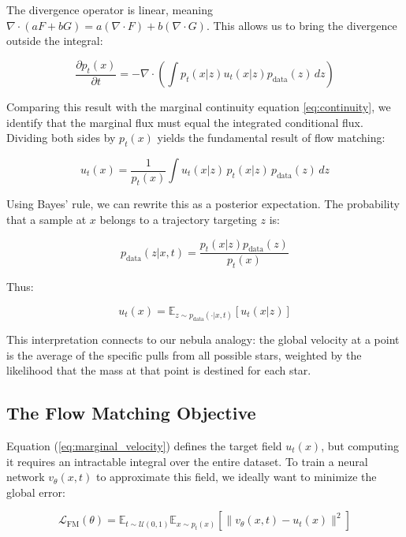 \documentclass{book}
\begin{document}
The divergence operator is linear, meaning $\nabla \cdot (aF + bG) = a(\nabla \cdot F) + b(\nabla \cdot G)$. This allows us to bring the divergence outside the integral:

\begin{equation}
\frac{\partial p_t(x)}{\partial t} = -\nabla \cdot \left( \int p_t(x|z) u_t(x|z) p_{\text{data}}(z) \, dz \right)
\end{equation}

Comparing this result with the marginal continuity equation \ref{eq:continuity}, we identify that the marginal flux must equal the integrated conditional flux. Dividing both sides by $p_t(x)$ yields the fundamental result of flow matching:

\begin{equation} \label{eq:marginal_velocity}
u_t(x) = \frac{1}{p_t(x)} \int u_t(x|z) \, p_t(x|z) \, p_{\text{data}}(z) \, dz
\end{equation}

Using Bayes' rule, we can rewrite this as a posterior expectation. The probability that a sample at $x$ belongs to a trajectory targeting $z$ is:

\begin{equation}
p_{\text{data}}(z|x, t) = \frac{p_t(x|z) p_{\text{data}}(z)}{p_t(x)}
\end{equation}

Thus:

\begin{equation}
u_t(x) = \mathbb{E}_{z \sim p_{\text{data}}(\cdot|x,t)} [u_t(x|z)]
\end{equation}

This interpretation connects to our nebula analogy: the global velocity at a point is the average of the specific pulls from all possible stars, weighted by the likelihood that the mass at that point is destined for each star.

\subsection{The Flow Matching Objective}

Equation (\ref{eq:marginal_velocity}) defines the target field $u_t(x)$, but computing it requires an intractable integral over the entire dataset. To train a neural network $v_\theta(x, t)$ to approximate this field, we ideally want to minimize the global error:

\begin{equation} \label{eq:loss_fm_ideal}
\mathcal{L}_{\text{FM}}(\theta) = \mathbb{E}_{t \sim \mathcal{U}(0,1)} \mathbb{E}_{x \sim p_t(x)} \left[ \| v_\theta(x, t) - u_t(x) \|^2 \right]
\end{equation}
\end{document}
